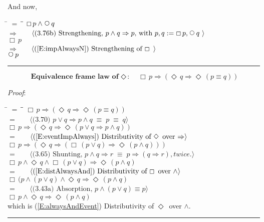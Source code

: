 \documentclass[12pt, fleqn, leqno]{article}
\newcommand{\lgap}{2pt}                             %
\newcommand{\mymathindent}{24pt}                    %
\newcommand{\equivs}{\ensuremath{\;\equiv\;}}       %
\newcommand{\impl}{\ensuremath{\Rightarrow}}        %
\newcommand{\Next}{\;\,\text{\raisebox{3.5pt}{\circle{6}}}}
\newcommand{\Event}{\Diamond\,}
\newcommand{\Always}{\Box\,}
\newcommand{\myqed}{\rule[-.23ex]{1.2ex}{2.0ex}}
\newcommand{\myqedtab}{\hspace{384pt}}              %
\newcommand{\Gll} {\langle}                         %
\newcommand{\Ggg} {\rangle}                         %
\newcommand{\Hint}[1]     {\ \ \ $\Gll              \mbox{#1} \Ggg$ }   %
\begin{document}
And now,
\begin{tabbing}
\hspace{\mymathindent} \= $= \;$ \= \myqedtab \= \kill
  \> \>   $\Always p  \land \Next q $\\[\lgap]
  \> $\impl$  \>  \Hint{(3.76b) Strengthening, $p\land q \impl p$, with $p,q := \Always p, \Next q$ }\\[\lgap]
  \> \>   $\Always p$\\[\lgap]
  \> $\impl$  \>  \Hint{(\ref{E:impAlwaysN}) Strengthening of $\Always$ }\\[\lgap]
  \> \>   $\Next p$\quad \myqed
\end{tabbing}

\begin{equation}\label{E:equivframelawEvent}
\textbf{Equivalence frame law of $\Event$:}\quad \Always p \impl (\Event q \impl \Event (p \equiv q))
\end{equation}

\emph{Proof}: 
\begin{tabbing}
\hspace{\mymathindent} \= $= \;$ \= \myqedtab \= \kill
  \> \>   $\Always p \impl (\Event q \impl \Event (p \equiv q))$\\[\lgap]
  \> $=$  \>  \Hint{(3.70) $p\lor q \impl p\land q \equivs p \equivs q$}\\[\lgap]
  \> \>   $\Always p \impl (\Event q \impl \Event (p \lor q \impl p \land q))$\\[\lgap]
  \> $=$  \>  \Hint{(\ref{E:eventImpAlways}) Distributivity of $\Event$ over $\impl$}\\[\lgap]
  \> \>   $\Always p \impl (\Event q \impl (\Always (p \lor q) \impl \Event (p \land q)))$\\[\lgap]
   \> $=$  \>  \Hint{(3.65) Shunting, $p\land q\impl r\equivs p\impl (q\impl r), twice.$}\\[\lgap]
  \> \>   $\Always p \land \Event q  \land \Always (p \lor q) \impl \Event (p \land q) $\\[\lgap]
   \> $=$  \>  \Hint{(\ref{E:distAlwaysAnd}) Distributivity of $\Always$ over $\land$}\\[\lgap]
  \> \>   $\Always (p  \land (p \lor q) \land \Event q  \impl \Event (p \land q)$\\[\lgap]
   \> $=$  \>  \Hint{(3.43a) Absorption, $p \land (p \lor q) \equiv p$}\\[\lgap]
   \> \>   $\Always p  \land \Event q  \impl \Event (p \land q)$\\[\lgap]
   \> which is (\ref{E:alwaysAndEvent}) Distributivity of $\Event$ over $\land$. \quad \myqed
\end{tabbing}
\end{document}

